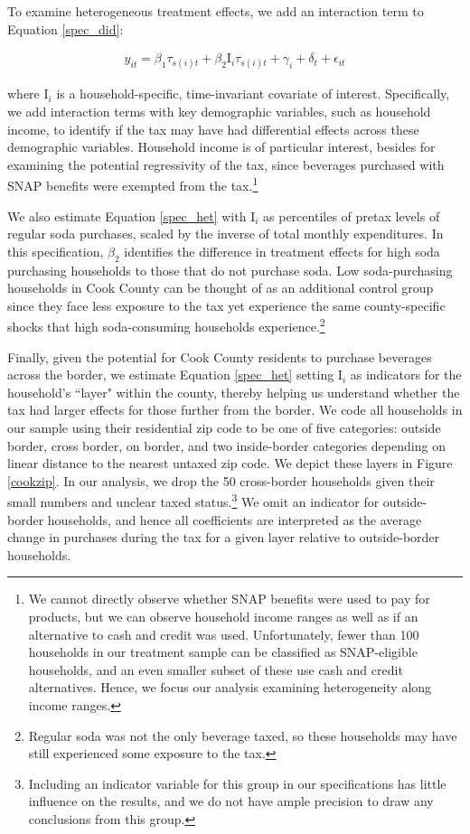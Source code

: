 \documentclass[12pt]{article}
\begin{document}
To examine heterogeneous treatment effects, we add an interaction term to Equation \ref{spec_did}:

\begin{align}
	y_{it} = \beta_1 \tau_{s(i)t} + \beta_2 \text{I}_{i} \tau_{s(i)t} + \gamma_i + \delta_t + \epsilon_{it} \label{spec_het}
\end{align}

where $\text{I}_{i}$ is a household-specific, time-invariant covariate of interest. Specifically, we add interaction terms with key demographic variables, such as household income, to identify if the tax may have had differential effects across these demographic variables. Household income is of particular interest, besides for examining the potential regressivity of the tax, since beverages purchased with SNAP benefits were exempted from the tax.\footnote{We cannot directly observe whether SNAP benefits were used to pay for products, but we can observe household income ranges as well as if an alternative to cash and credit was used. Unfortunately, fewer than 100 households in our treatment sample can be classified as SNAP-eligible households, and an even smaller subset of these use cash and credit alternatives. Hence, we focus our analysis examining heterogeneity along income ranges.}

We also estimate Equation \ref{spec_het} with $\text{I}_{i}$ as percentiles of pretax levels of regular soda purchases, scaled by the inverse of total monthly expenditures. In this specification, $\beta_2$ identifies the difference in treatment effects for high soda purchasing households to those that do not purchase soda. Low soda-purchasing households in Cook County can be thought of as an additional control group since they face less exposure to the tax yet experience the same county-specific shocks that high soda-consuming households experience.\footnote{Regular soda was not the only beverage taxed, so these households may have still experienced some exposure to the tax.}

Finally, given the potential for Cook County residents to purchase beverages across the border, we estimate Equation \ref{spec_het} setting $\text{I}_{i}$ as indicators for the household's ``layer" within the county, thereby helping us understand whether the tax had larger effects for those further from the border. We code all households in our sample using their residential zip code to be one of five categories: outside border, cross border, on border, and two inside-border categories depending on linear distance to the nearest untaxed zip code. We depict these layers in Figure \ref{cookzip}. In our analysis, we drop the 50 cross-border households given their small numbers and unclear taxed status.\footnote{Including an indicator variable for this group in our specifications has little influence on the results, and we do not have ample precision to draw any conclusions from this group.} We omit an indicator for outside-border households, and hence all coefficients are interpreted as the average change in purchases during the tax for a given layer relative to outside-border households.
\end{document}
